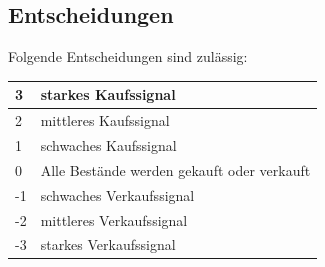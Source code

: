 \subsection{Entscheidungen}
Folgende Entscheidungen sind zulässig:
\begin{center}
\begin{tabular}{ |  p{1cm} | p{8cm} |}
\hline 
3 & starkes Kaufssignal \\ \hline
2 &   mittleres Kaufssignal \\ \hline
1 &  schwaches Kaufssignal\\ \hline
0 &  Alle Bestände werden gekauft oder verkauft\\ \hline
-1 &  schwaches Verkaufssignal\\ \hline
-2 &  mittleres Verkaufssignal\\ \hline
-3 &  starkes Verkaufssignal\\ \hline
\end{tabular}
\end{center}
